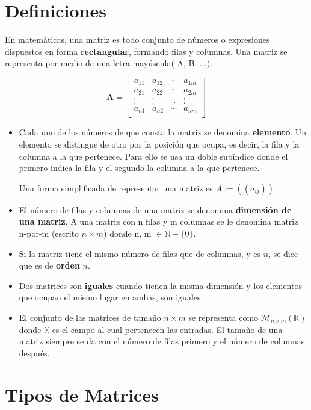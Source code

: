 \section{Definiciones}
En matemáticas, una matriz es todo conjunto de números o expresiones dispuestos en forma \textbf{rectangular}, formando filas y columnas. Una matriz se representa por medio de una letra mayúscula( A, B. ...).

\begin{equation}
\textbf{A} = \left[
\begin{array}{cccc}
a_{11} & a_{12} & \cdots & a_{1m} \\
a_{21} & a_{22} & \cdots & a_{2m} \\
\vdots & \vdots & \ddots & \vdots \\
a_{n1} & a_{n2} & \cdots & a_{nm} \\
\end{array}
\right]
\end{equation}

\begin{itemize}
 \item Cada uno de los números de que consta la matriz se denomina \textbf{elemento}. Un elemento se distingue de otro por la posición que ocupa, es decir, la fila y la columna a la que pertenece. Para ello se usa un doble subíndice donde el primero indica la fila y el segundo la columna a la que pertenece.
 
 Una forma simplificada de representar una matriz es $A:= ((a_{ij}))$
 \item El número de filas y columnas de una matriz se denomina \textbf{dimensión de una matriz}. A una matriz con n filas y m columnas se le denomina matriz n-por-m (escrito $n\times{m}$) donde n, m $\in{\mathbb{N}} - \{0\}$.
 \item Si la matriz tiene el mismo número de filas que de columnas, y es $n$, se dice que es de \textbf{orden} $n$.
 \item Dos matrices son \textbf{iguales} cuando tienen la misma dimensión y los elementos que ocupan el mismo lugar en ambas, son iguales.
 \item El conjunto de las matrices de tamaño $n \times{m}$ se representa como $\mathcal{M}_{n\times {m}}(\mathbb{K})$ donde $\mathbb{K}$ es el campo al cual pertenecen las entradas. El tamaño de una matriz siempre se da con el número de filas primero y el número de columnas después.
 \end {itemize}
 
\section{Tipos de Matrices}

